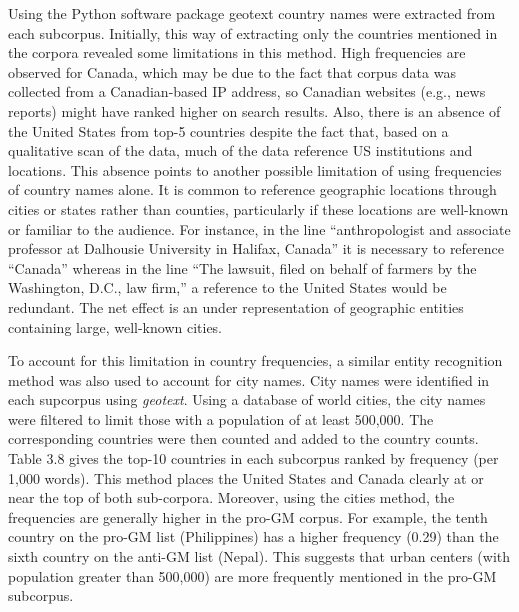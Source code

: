 Using the Python software package geotext \citep{Palenzuelaa} country names were extracted from each subcorpus. Initially, this way of extracting only the countries mentioned in the corpora revealed some limitations in this method. High frequencies are observed for Canada, which may be due to the fact that corpus data was collected from a Canadian-based IP address, so Canadian websites (e.g., news reports) might have ranked higher on search results. Also, there is an absence of the United States from top-5 countries despite the fact that, based on a qualitative scan of the data, much of the data reference US institutions and locations. This absence points to another possible limitation of using frequencies of country names alone. It is common to reference geographic locations through cities or states rather than counties, particularly if these locations are well-known or familiar to the audience. For instance, in the line ``anthropologist and associate professor at Dalhousie University in Halifax, Canada'' it is necessary to reference ``Canada'' whereas in the line ``The lawsuit, filed on behalf of farmers by the Washington, D.C., law firm,'' a reference to the United States would be redundant. The net effect is an under representation of geographic entities containing large, well-known cities.

To account for this limitation in country frequencies, a similar entity recognition method was also used to account for city names. City names were identified in each supcorpus using \textit{geotext}. Using a database of world cities, the city names were filtered to limit those with a population of at least 500,000. The corresponding countries were then counted and added to the country counts. Table 3.8 gives the top-10 countries in each subcorpus ranked by frequency (per 1,000 words). This method places the United States and Canada clearly at or near the top of both sub-corpora. Moreover, using the cities method, the frequencies are generally higher in the pro-GM corpus. For example, the tenth country on the pro-GM list (Philippines) has a higher frequency (0.29) than the sixth country on the anti-GM list (Nepal). This suggests that urban centers (with population greater than 500,000) are more frequently mentioned in the pro-GM subcorpus. 

